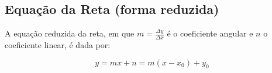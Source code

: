 \subsection{Equação da Reta (forma reduzida)}

A equação reduzida da reta, em que $m = \frac{\Delta y}{\Delta x}$ é o coeficiente angular e $n$ o coeficiente linear, é dada por:

\[
y = mx + n = m(x - x_0) + y_0
\]